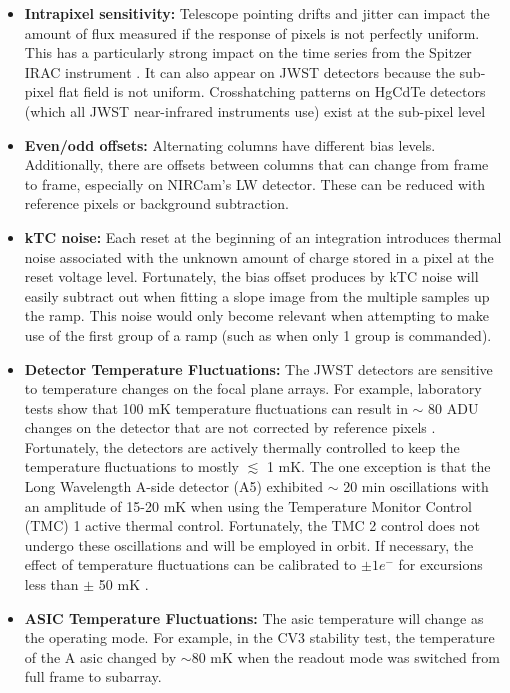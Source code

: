 \documentclass[]{aastex62}
\begin{document}
\begin{itemize}[noitemsep]
	\item \textbf{Intrapixel sensitivity:} Telescope pointing drifts and jitter can impact the amount of flux measured if the response of pixels is not perfectly uniform.
	This has a particularly strong impact on the time series from the Spitzer IRAC instrument \citep{ingalls2016spitzerRepeatability}.
	It can also appear on JWST detectors because the sub-pixel flat field is not uniform.
	Crosshatching patterns on HgCdTe detectors (which all JWST near-infrared instruments use) exist at the sub-pixel level  \citep{shapiro2018crosshatch,ninan2019crosshatchHPF}
	\item \textbf{Even/odd offsets:} Alternating columns have different bias levels. Additionally, there are offsets between columns that can change from frame to frame, especially on NIRCam's LW detector.
	These can be reduced with reference pixels or background subtraction.
	\item \textbf{kTC noise:} Each reset at the beginning of an integration introduces thermal noise associated with the unknown amount of charge stored in a pixel at the reset voltage level.
	Fortunately, the bias offset produces by kTC noise will easily subtract out when fitting a slope image from the multiple samples up the ramp.
	This noise would  only become relevant when attempting to make use of the first group of a ramp (such as when only 1 group is commanded).
	\item \textbf{Detector Temperature Fluctuations:} The JWST detectors are sensitive to temperature changes on the focal plane arrays. For example, laboratory tests show that 100 mK temperature fluctuations can result in $\sim$ 80 ADU changes on the detector that are not corrected by reference pixels \citep{hall2005jwstArrays}. Fortunately, the detectors are actively thermally controlled to keep the temperature fluctuations to mostly $\lesssim$ 1 mK.
The one exception is that the Long Wavelength A-side detector (A5) exhibited $\sim$ 20 min oscillations with an amplitude of 15-20 mK when using the Temperature Monitor Control (TMC) 1 active thermal control.
Fortunately, the TMC 2 control does not undergo these oscillations and will be employed in orbit.
If necessary, the effect of temperature fluctuations can be calibrated to $\pm 1 e^-$ for excursions less than $\pm$ 50 mK \citep{hall2005jwstArrays}.
	\item \textbf{ASIC Temperature Fluctuations:} The asic temperature will change as the operating mode. For example, in the CV3 stability test, the temperature of the A asic changed by $\sim$80 mK when the readout mode was switched from full frame to subarray.

\end{itemize}
\end{document}
